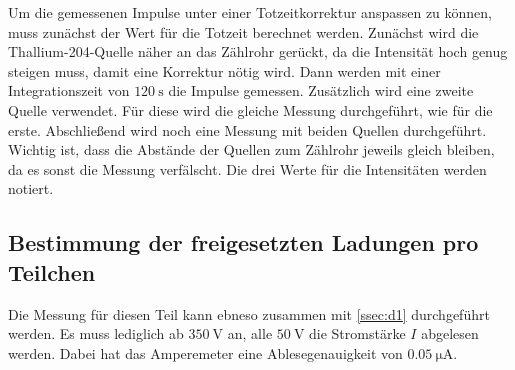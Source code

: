Um die gemessenen Impulse unter einer Totzeitkorrektur anspassen zu können, muss zunächst der Wert für die Totzeit berechnet werden.
Zunächst wird die Thallium-204-Quelle näher an das Zählrohr gerückt, da die Intensität hoch genug steigen muss, damit eine Korrektur nötig wird.
Dann werden mit einer Integrationszeit von $\SI{120}{\second}$ die Impulse gemessen.
Zusätzlich wird eine zweite Quelle verwendet.
Für diese wird die gleiche Messung durchgeführt, wie für die erste.
Abschließend wird noch eine Messung mit beiden Quellen durchgeführt.
Wichtig ist, dass die Abstände der Quellen zum Zählrohr jeweils gleich bleiben, da es sonst die Messung verfälscht.
Die drei Werte für die Intensitäten werden notiert.

\subsection{Bestimmung der freigesetzten Ladungen pro Teilchen}
\label{ssec:d3}

Die Messung für diesen Teil kann ebneso zusammen mit \autoref{ssec:d1} durchgeführt werden.
Es muss lediglich ab $\SI{350}{\volt}$ an, alle $\SI{50}{\volt}$ die Stromstärke $I$ abgelesen werden.
Dabei hat das Amperemeter eine Ablesegenauigkeit von $\SI{0.05}{\micro\ampere}$.